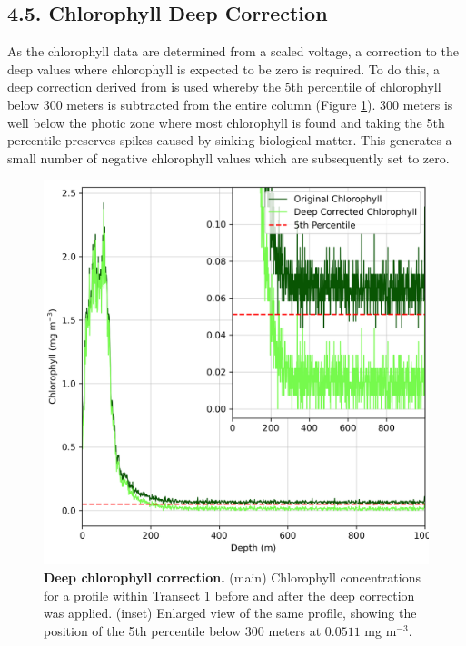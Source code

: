 \documentclass[
	a4paper, %
	10pt, %
	unnumberedsections, %
	twoside, %
]{LTJournalArticle}
\begin{document}
\begin{multicols}{2}

\subsection{4.5. Chlorophyll Deep Correction}
As the chlorophyll data are determined from a scaled voltage, a correction to the deep values where chlorophyll is expected
to be zero is required. To do this, a deep correction derived from \citet{ref43} is used whereby the 5th percentile of chlorophyll
below 300 meters is subtracted from the entire column (Figure \ref{fig:A}). 
300 meters is well below the photic zone where most chlorophyll is found
and taking the 5th percentile preserves spikes caused by sinking biological matter.
This generates a small number of negative chlorophyll values which are subsequently set to zero.
\begin{figure}[H] 
	\includegraphics[width=\linewidth]{Louis/figures/figureA.png}
	\caption{\textbf{Deep chlorophyll correction.} (main) Chlorophyll concentrations for a profile within Transect 1 before and after the deep correction was applied. (inset) Enlarged view of the same profile, showing the position of the 5th percentile below 300 meters at $0.0511$ mg m$^{-3}$.}
	\label{fig:A}
\end{figure}


\end{multicols}
\end{document}
